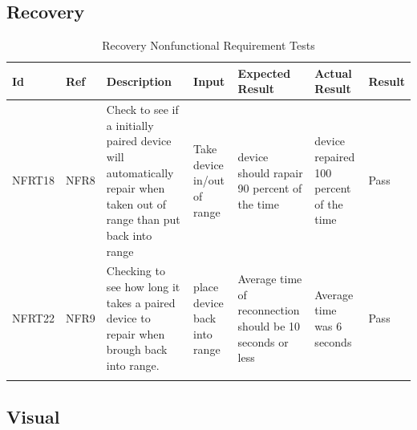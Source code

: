 \documentclass[12pt, titlepage]{article}
\begin{document}
\subsection{Recovery}

\begin{longtable}{|p{1.4cm}|p{1cm}|p{3cm}|p{1.5cm}|p{2.5cm}|p{2cm}|p{1.2cm}|}
  \endfirsthead
  \endhead
  \hline
  \textbf{Id} & \textbf{Ref} & \textbf{Description}                                                         & \textbf{Input}                                    & \textbf{Expected Result}    & \textbf{Actual Result}                          & \textbf{Result}                                     \\ \hline
  NFRT18        & NFR8          & Check to see if a initially paired device will automatically repair when taken out of range than put back into range              & Take device in/out of range  & device should rapair 90 percent of the time   & device repaired 100 percent of the time    & {\color[HTML]{32CB00} Pass}                         \\ \hline
  NFRT22        & NFR9          & Checking to see how long it takes a paired device to repair when brough back into range.             & place device back into range    & Average time of reconnection should be 10 seconds or less          & Average time was 6 seconds       & {\color[HTML]{32CB00} Pass}                         \\ \hline
  \caption{Recovery Nonfunctional Requirement Tests}
  \label{RecoveryNonfunctionalRequirementTests}
\end{longtable}


\subsection{Visual}
\end{document}
